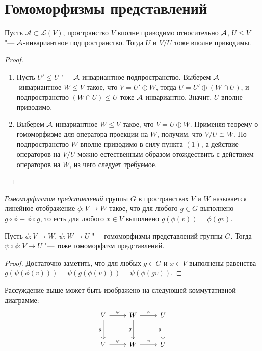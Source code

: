 \section{Гомоморфизмы представлений}

\begin{theorem}
	Пусть $\mathcal A \subset \mathcal{L}(V)$, пространство $V$ вполне приводимо относительно $\mathcal A$, $U \le V$ "--- $\mathcal A$-инвариантное подпространство. Тогда $U$ и $V / U$ тоже вполне приводимы.
\end{theorem}

\begin{proof}~
	\begin{enumerate}
		\item Пусть $U' \le U$ "--- $\mathcal A$-инвариантное подпространство. Выберем $\mathcal A$-инвариантное $W \le V$ такое, что $V = U' \oplus W$, тогда $U = U' \oplus (W \cap U)$, и подпространство $(W \cap U) \le U$ тоже $\mathcal A$-инвариантно. Значит, $U$ вполне приводимо.
		\item Выберем $\mathcal A$-инвариантное $W \le V$ такое, что $V = U \oplus W$. Применяя теорему о гомоморфизме для оператора проекции на $W$, получим, что $V / U \cong W$. Но подпространство $W$ вполне приводимо в силу пункта $(1)$, а действие операторов на $V / U$ можно естественным образом отождествить с действием операторов на $W$, из чего следует требуемое.\qedhere
	\end{enumerate}
\end{proof}

\begin{definition}
	\textit{Гомоморфизмом представлений} группы $G$ в пространствах $V$ и $W$ называется линейное отображение $\phi : V \to W$ такое, что для любого $g \in G$ выполнено $g\circ\phi \equiv \phi\circ g$, то есть для любого $x \in V$ выполнено $g(\phi(v)) = \phi(gv)$.
\end{definition}

\begin{proposition}
	Пусть $\phi : V \to W$, $\psi : W \to U$ "--- гомоморфизмы представлений группы $G$. Тогда $\psi\circ\phi: V \to U$ "--- тоже гомоморфизм представлений.
\end{proposition}

\begin{proof}
	Достаточно заметить, что для любых $g \in G$ и $x \in V$ выполнены равенства $g(\psi(\phi(v))) = \psi(g(\phi(v))) = \psi(\phi(gv))$.
\end{proof}

\begin{note}
	Рассуждение выше может быть изображено на следующей коммутативной диаграмме:
	\[
	\begin{tikzcd}[row sep = large]
		V \arrow{r}{\phi} \arrow[swap]{d}{g} & W \arrow{r}{\phi} \arrow[swap]{d}{g} & U \arrow[swap]{d}{g}\\
		V \arrow{r}{\phi} & W \arrow{r}{\phi} & U
	\end{tikzcd}
	\]
\end{note}

